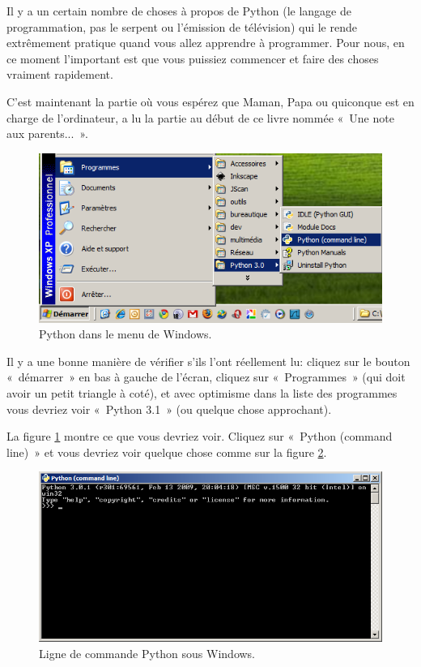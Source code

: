 Il y a un certain nombre de choses à propos de Python (le langage de programmation, pas le serpent ou l'émission de télévision) qui le rende extrêmement pratique quand vous allez apprendre à programmer. Pour nous, en ce moment l'important est que vous puissiez commencer et faire des choses vraiment rapidement.

C'est maintenant la partie où vous espérez que Maman, Papa ou quiconque est en charge de l'ordinateur, a lu la partie au début de ce livre nommée « Une note aux parents... ».

\begin{figure}[!ht]
\capstart
\centering
\includegraphics[scale=0.6]{images/startmenu}
\caption{Python dans le menu de Windows.}\label{fig:startmenu}
\end{figure}

Il y a une bonne manière de vérifier s'ils l'ont réellement lu: cliquez sur le bouton « démarrer » en bas à gauche de l'écran, cliquez sur « Programmes » (qui doit avoir un petit triangle à coté), et avec optimisme dans la liste des programmes vous devriez voir « Python 3.1 » (ou quelque chose approchant).
 
La figure \ref{fig:startmenu} montre ce que vous devriez voir. Cliquez sur « Python (command line) » et vous devriez voir quelque chose comme sur la figure \ref{fig:pycl}.

\begin{figure}[!ht]
\centering
\includegraphics[scale=0.6]{images/pycl}
\caption{Ligne de commande Python sous Windows.}\label{fig:pycl}
\end{figure}

